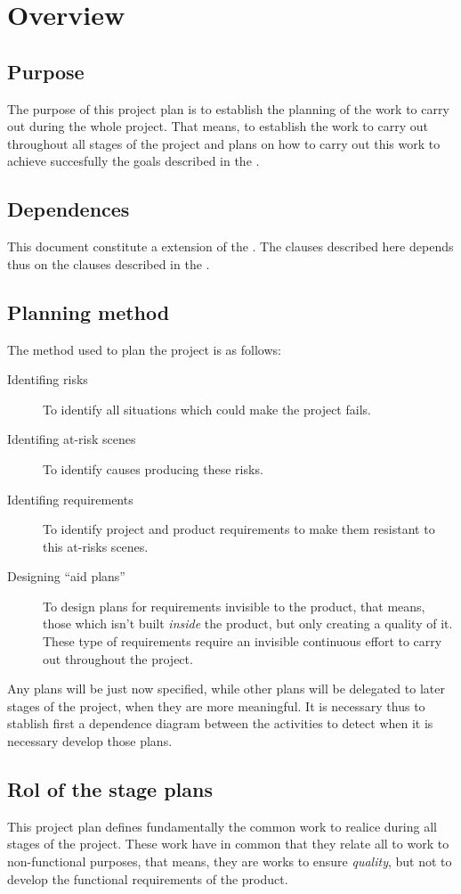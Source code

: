 \documentclass[twocolumn, 9pt]{extarticle}
\begin{document}
\section{Overview}
\subsection{Purpose}
The purpose of this project plan is to establish the planning of the
work to carry out during the whole project. That means, to establish
the work to carry out throughout all stages of the project and plans
on how to carry out this work to achieve succesfully the goals
described in the \favp.

\subsection{Dependences}
This document constitute a extension of the \favc. The clauses
described here depends thus on the clauses described in the \favc.

\subsection{Planning method}
\label{ssec:planning-method}
The method used to plan the project is as follows:

\begin{description}
\item[Identifing risks] To identify all situations which could make the
  project fails.
\item[Identifing at-risk scenes] To identify causes producing these risks.
\item[Identifing requirements] To identify project and product
  requirements to make them resistant to this at-risks scenes.
\item[Designing ``aid plans''] To design plans for
  requirements invisible to the product, that means, those which isn't
  built \textit{inside} the product, but only creating a quality of
  it. These type of requirements require an invisible continuous
  effort to carry out throughout the project.
\end{description}

Any plans will be just now specified, while other plans will be
delegated to later stages of the project, when they are more
meaningful. It is necessary thus to stablish first a dependence
diagram between the activities to detect when it is necessary
develop those plans.

\subsection{Rol of the stage plans}
This project plan defines fundamentally the common work to realice
during all stages of the project. These work have in common that they
relate all to work to non-functional purposes, that means, they are
works to ensure \textit{quality}, but not to develop the functional
requirements of the product.
\end{document}
